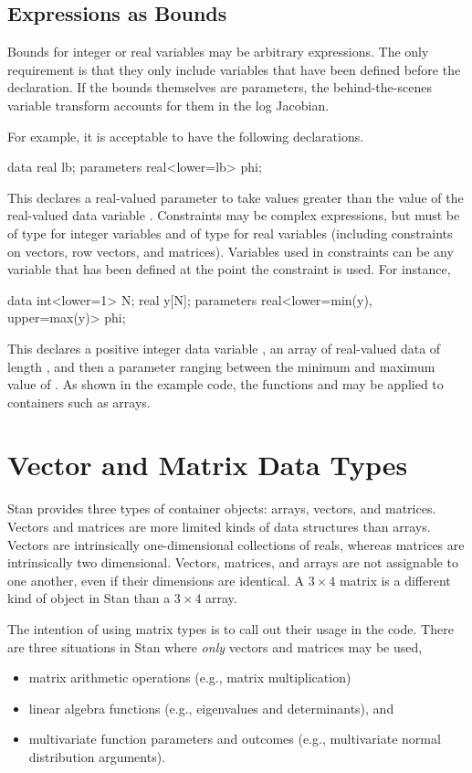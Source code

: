 \subsection{Expressions as Bounds}

Bounds for integer or real variables may be arbitrary expressions.
The only requirement is that they only include variables that have
been defined before the declaration.  If the bounds themselves are
parameters, the behind-the-scenes variable transform accounts for them
in the log Jacobian.

For example, it is acceptable to have the
following declarations.
%
\begin{stancode}
data {
 real lb;
}
parameters {
   real<lower=lb> phi;
}
\end{stancode}
%
This declares a real-valued parameter  to take values
greater than the value of the real-valued data variable .
Constraints may be complex expressions, but must be of type 
for integer variables and of type  for real variables
(including constraints on vectors, row vectors, and matrices).
Variables used in constraints can be any variable that has been
defined at the point the constraint is used.  For instance,
\begin{stancode}
data {
   int<lower=1> N;
   real y[N];
}
parameters {
   real<lower=min(y), upper=max(y)> phi;
}
\end{stancode}
%
This declares a positive integer data variable , an array
 of real-valued data of length , and then a parameter
ranging between the minimum and maximum value of .  As shown
in the example code, the functions  and  may
be applied to containers such as arrays.

\section{Vector and Matrix Data Types}

Stan provides three types of container objects: arrays, vectors, and
matrices. Vectors and matrices are more limited kinds of data
structures than arrays.  Vectors are intrinsically one-dimensional
collections of reals, whereas matrices are intrinsically two
dimensional.  Vectors, matrices, and arrays are not assignable to one
another, even if their dimensions are identical.  A $3 \times 4$
matrix is a different kind of object in Stan than a $3 \times 4$
array.

The intention of using matrix types is to call out their usage in the
code.  There are three situations in Stan where {\it only} vectors and
matrices may be used,
%
\begin{itemize}
\item matrix arithmetic operations (e.g., matrix multiplication)
\item linear algebra functions (e.g., eigenvalues and determinants),
  and
\item multivariate function parameters and outcomes (e.g.,
  multivariate normal distribution arguments).
\end{itemize}
%

